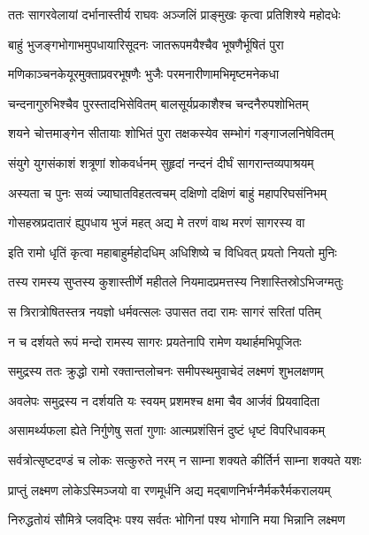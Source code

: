 
\twolineshloka
{ततः सागरवेलायां दर्भानास्तीर्य राघवः}
{अञ्जलिं प्राङ्मुखः कृत्वा प्रतिशिश्ये महोदधेः} %

\twolineshloka
{बाहुं भुजङ्गभोगाभमुपधायारिसूदनः}
{जातरूपमयैश्चैव भूषणैर्भूषितं पुरा} %

\twolineshloka
{मणिकाञ्चनकेयूरमुक्ताप्रवरभूषणैः}
{भुजैः परमनारीणामभिमृष्टमनेकधा} %

\twolineshloka
{चन्दनागुरुभिश्चैव पुरस्तादभिसेवितम्}
{बालसूर्यप्रकाशैश्च चन्दनैरुपशोभितम्} %

\twolineshloka
{शयने चोत्तमाङ्गेन सीतायाः शोभितं पुरा}
{तक्षकस्येव सम्भोगं गङ्गाजलनिषेवितम्} %

\twolineshloka
{संयुगे युगसंकाशं शत्रूणां शोकवर्धनम्}
{सुहृदां नन्दनं दीर्घं सागरान्तव्यपाश्रयम्} %

\twolineshloka
{अस्यता च पुनः सव्यं ज्याघातविहतत्वचम्}
{दक्षिणो दक्षिणं बाहुं महापरिघसंनिभम्} %

\twolineshloka
{गोसहस्रप्रदातारं ह्युपधाय भुजं महत्}
{अद्य मे तरणं वाथ मरणं सागरस्य वा} %

\twolineshloka
{इति रामो धृतिं कृत्वा महाबाहुर्महोदधिम्}
{अधिशिष्ये च विधिवत् प्रयतो नियतो मुनिः} %

\twolineshloka
{तस्य रामस्य सुप्तस्य कुशास्तीर्णे महीतले}
{नियमादप्रमत्तस्य निशास्तिस्रोऽभिजग्मतुः} %

\twolineshloka
{स त्रिरात्रोषितस्तत्र नयज्ञो धर्मवत्सलः}
{उपासत तदा रामः सागरं सरितां पतिम्} %

\twolineshloka
{न च दर्शयते रूपं मन्दो रामस्य सागरः}
{प्रयतेनापि रामेण यथार्हमभिपूजितः} %

\twolineshloka
{समुद्रस्य ततः क्रुद्धो रामो रक्तान्तलोचनः}
{समीपस्थमुवाचेदं लक्ष्मणं शुभलक्षणम्} %

\twolineshloka
{अवलेपः समुद्रस्य न दर्शयति यः स्वयम्}
{प्रशमश्च क्षमा चैव आर्जवं प्रियवादिता} %

\twolineshloka
{असामर्थ्यफला ह्येते निर्गुणेषु सतां गुणाः}
{आत्मप्रशंसिनं दुष्टं धृष्टं विपरिधावकम्} %

\twolineshloka
{सर्वत्रोत्सृष्टदण्डं च लोकः सत्कुरुते नरम्}
{न साम्ना शक्यते कीर्तिर्न साम्ना शक्यते यशः} %

\twolineshloka
{प्राप्तुं लक्ष्मण लोकेऽस्मिञ्जयो वा रणमूर्धनि}
{अद्य मद्बाणनिर्भग्नैर्मकरैर्मकरालयम्} %

\twolineshloka
{निरुद्धतोयं सौमित्रे प्लवद्भिः पश्य सर्वतः}
{भोगिनां पश्य भोगानि मया भिन्नानि लक्ष्मण} %

